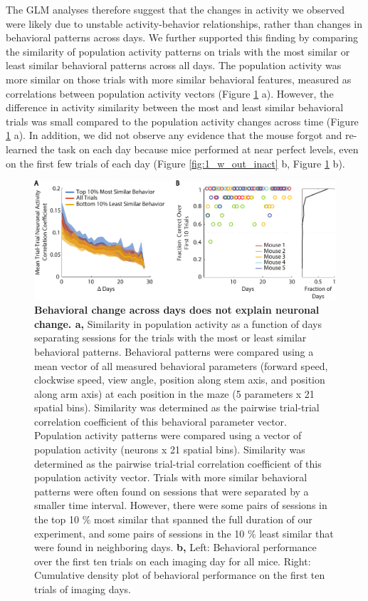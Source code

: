 \bigskip

The GLM analyses therefore suggest that the changes in activity we observed were likely due to unstable activity-behavior relationships, rather than changes in behavioral patterns across days. We further supported this finding by comparing the similarity of population activity patterns on trials with the most similar or least similar behavioral patterns across all days. The population activity was more similar on those trials with more similar behavioral features, measured as correlations between population activity vectors (Figure \ref{fig:behave_controls} a). However, the difference in activity similarity between the most and least similar behavioral trials was small compared to the population activity changes across time (Figure \ref{fig:behave_controls} a). In addition, we did not observe any evidence that the mouse forgot and re-learned the task on each day because mice performed at near perfect levels, even on the first few trials of each day (Figure \ref{fig:1_w_out_inact} b, Figure \ref{fig:behave_controls} b).

\begin{figure}
\includegraphics[width=\textwidth]{figures/behave_controls.pdf}
\caption[Behavioral change across days does not explain neuronal change.]{\textbf{Behavioral change across days does not explain neuronal change. a,} Similarity in population activity as a function of days separating sessions for the trials with the most or least similar behavioral patterns. Behavioral patterns were compared using a mean vector of all measured behavioral parameters (forward speed, clockwise speed, view angle, position along stem axis, and position along arm axis) at each position in the maze (5 parameters x 21 spatial bins). Similarity was determined as the pairwise trial-trial correlation coefficient of this behavioral parameter vector. Population activity patterns were compared using a vector of population activity (neurons x 21 spatial bins). Similarity was determined as the pairwise trial-trial correlation coefficient of this population activity vector. Trials with more similar behavioral patterns were often found on sessions that were separated by a smaller time interval. However, there were some pairs of sessions in the top 10 $\%$ most similar that spanned the full duration of our experiment, and some pairs of sessions in the 10 $\%$ least similar that were found in neighboring days. 
%
\textbf{b,} Left: Behavioral performance over the first ten trials on each imaging day for all mice. Right: Cumulative density plot of behavioral performance on the first ten trials of imaging days. 
\label{fig:behave_controls}}
\end{figure}

